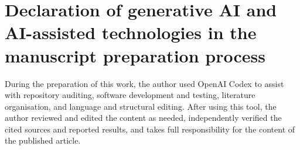 \documentclass[a4paper,fleqn]{cas-sc}
\begin{document}
\section*{Declaration of generative AI and AI-assisted technologies in the manuscript preparation process}
During the preparation of this work, the author used OpenAI Codex to assist with
repository auditing, software development and testing, literature organisation,
and language and structural editing. After using this tool, the author reviewed
and edited the content as needed, independently verified the cited sources and
reported results, and takes full responsibility for the content of the
published article.





\end{document}
